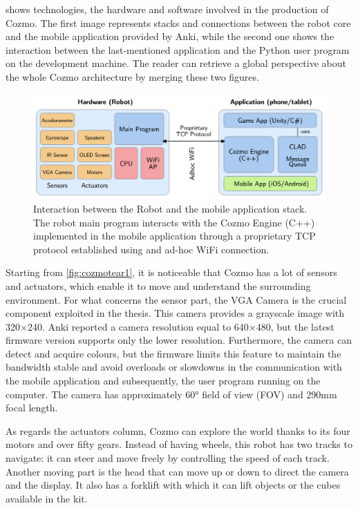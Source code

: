 shows technologies, the hardware and software involved in the production of Cozmo.
The first image represents stacks and connections between the robot core and the mobile application provided by Anki, while the second one shows the interaction between the last-mentioned application and the Python user program on the development machine.
The reader can retrieve a global perspective about the whole Cozmo architecture by merging these two figures.

\begin{figure}
	\centering
	\includegraphics[width=\textwidth]{img/cozmo-hw.png}
	\caption[Interaction Robot/Application]{Interaction between the Robot and the mobile application stack.
The robot main program interacts with the Cozmo Engine (C++) implemented in the mobile application through a proprietary TCP protocol established using and ad-hoc WiFi connection.
\cite{mellon2017cognitive}}
	\label{fig:cozmotear1}
\end{figure}

Starting from \vref{fig:cozmotear1}, it is noticeable that Cozmo has a lot of sensors and actuators, which enable it to move and understand the surrounding environment.
For what concerns the sensor part, the VGA Camera is the crucial component exploited in the thesis.
This camera provides a grayscale image with 320$\times$240.
Anki reported a camera resolution equal to 640$\times$480, but the latest firmware version supports only the lower resolution.
Furthermore, the camera can detect and acquire colours, but the firmware limits this feature to maintain the bandwidth stable and avoid overloads or slowdowns in the communication with the mobile application and subsequently, the user program running on the computer.
The camera has approximately 60° field of view (FOV) and 290mm focal length.

As regards the actuators column, Cozmo can explore the world thanks to its four motors and over fifty gears.
Instead of having wheels, this robot has two tracks to navigate: it can steer and move freely by controlling the speed of each track.
Another moving part is the head that can move up or down to direct the camera and the display.
It also has a forklift with which it can lift objects or the cubes available in the kit.

